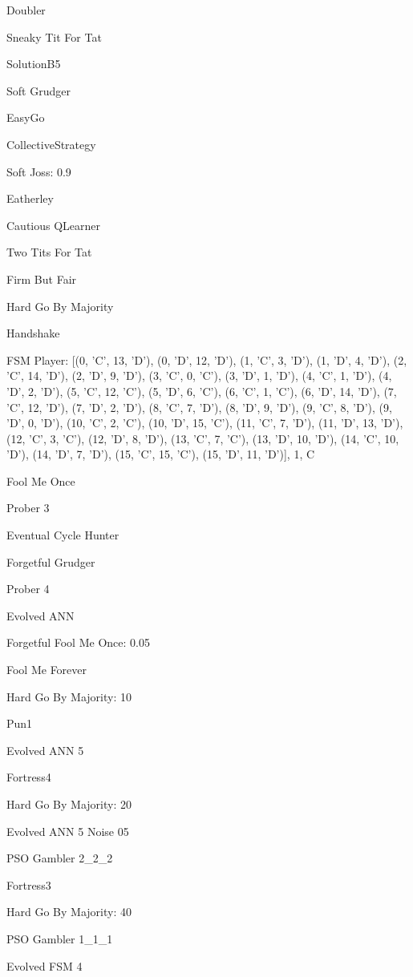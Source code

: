 \item Doubler
\item Sneaky Tit For Tat
\item SolutionB5
\item Soft Grudger
\item EasyGo
\item CollectiveStrategy
\item Soft Joss: 0.9
\item Eatherley
\item Cautious QLearner
\item Two Tits For Tat
\item Firm But Fair
\item Hard Go By Majority
\item Handshake
\item FSM Player: [(0, 'C', 13, 'D'), (0, 'D', 12, 'D'), (1, 'C', 3, 'D'), (1, 'D', 4, 'D'), (2, 'C', 14, 'D'), (2, 'D', 9, 'D'), (3, 'C', 0, 'C'), (3, 'D', 1, 'D'), (4, 'C', 1, 'D'), (4, 'D', 2, 'D'), (5, 'C', 12, 'C'), (5, 'D', 6, 'C'), (6, 'C', 1, 'C'), (6, 'D', 14, 'D'), (7, 'C', 12, 'D'), (7, 'D', 2, 'D'), (8, 'C', 7, 'D'), (8, 'D', 9, 'D'), (9, 'C', 8, 'D'), (9, 'D', 0, 'D'), (10, 'C', 2, 'C'), (10, 'D', 15, 'C'), (11, 'C', 7, 'D'), (11, 'D', 13, 'D'), (12, 'C', 3, 'C'), (12, 'D', 8, 'D'), (13, 'C', 7, 'C'), (13, 'D', 10, 'D'), (14, 'C', 10, 'D'), (14, 'D', 7, 'D'), (15, 'C', 15, 'C'), (15, 'D', 11, 'D')], 1, C
\item Fool Me Once
\item Prober 3
\item Eventual Cycle Hunter
\item Forgetful Grudger
\item Prober 4
\item Evolved ANN
\item Forgetful Fool Me Once: 0.05
\item Fool Me Forever
\item Hard Go By Majority: 10
\item Pun1
\item Evolved ANN 5
\item Fortress4
\item Hard Go By Majority: 20
\item Evolved ANN 5 Noise 05
\item PSO Gambler 2\_2\_2
\item Fortress3
\item Hard Go By Majority: 40
\item PSO Gambler 1\_1\_1
\item Evolved FSM 4
